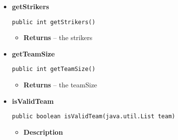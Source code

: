 \documentclass[11pt,a4paper]{report}
\begin{document}
{{{{{{{{{{\begin{itemize}
{{\bf  getMidfielders}\\
\begin{lstlisting}[frame=none]
public int getMidfielders()\end{lstlisting} %
\begin{itemize}
\item{{\bf  Returns} -- 
the midfielders 
}%
\end{itemize}
}%
\item{ 
{\bf  getStrikers}\\
\begin{lstlisting}[frame=none]
public int getStrikers()\end{lstlisting} %
\begin{itemize}
\item{{\bf  Returns} -- 
the strikers 
}%
\end{itemize}
}%
\item{ 
{\bf  getTeamSize}\\
\begin{lstlisting}[frame=none]
public int getTeamSize()\end{lstlisting} %
\begin{itemize}
\item{{\bf  Returns} -- 
the teamSize 
}%
\end{itemize}
}%
\item{ 
{\bf  isValidTeam}\\
\begin{lstlisting}[frame=none]
public boolean isValidTeam(java.util.List team)\end{lstlisting} %
\begin{itemize}
\item{
{\bf  Description}

}
\end{itemize}}
\end{itemize}}}}}}}}}}}
\end{document}
